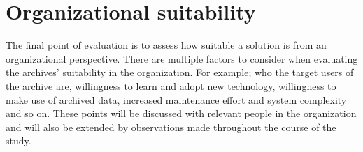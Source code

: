 \section{Organizational suitability}
The final point of evaluation is to assess how suitable a solution is from an organizational perspective. There are multiple factors to consider when evaluating the archives' suitability in the organization. For example; who the target users of the archive are, willingness to learn and adopt new technology, willingness to make use of archived data, increased maintenance effort and system complexity and so on. These points will be discussed with relevant people in the organization and will also be extended by observations made throughout the course of the study.


